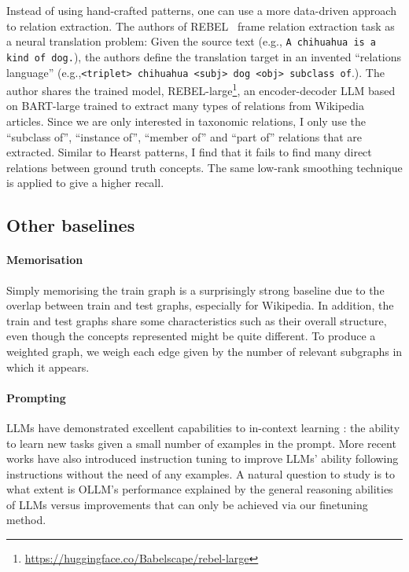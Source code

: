 Instead of using hand-crafted patterns, one can use a more data-driven approach to relation extraction. The authors of REBEL~\cite{cabot2021rebel} frame relation extraction task as a neural translation problem: Given the source text (e.g., \texttt{A chihuahua is a kind of dog.}), the authors define the translation target in an invented ``relations language'' (e.g.,\texttt{<triplet> chihuahua <subj> dog <obj> subclass of}.). The author shares the trained model, REBEL-large\footnote{\url{https://huggingface.co/Babelscape/rebel-large}}, an encoder-decoder LLM based on BART-large \cite{lewis2019bart} trained to extract many types of relations from Wikipedia articles. Since we are only interested in taxonomic relations, I only use the ``subclass of'', ``instance of'', ``member of'' and ``part of'' relations that are extracted. Similar to Hearst patterns, I find that it fails to find many direct relations between ground truth concepts. The same low-rank smoothing technique is applied to give a higher recall.


\subsection{Other baselines}

\paragraph{Memorisation}
Simply memorising the train graph is a surprisingly strong baseline due to the overlap between train and test graphs, especially for Wikipedia. In addition, the train and test graphs share some characteristics such as their overall structure, even though the concepts represented might be quite different. To produce a weighted graph, we weigh each edge given by the number of relevant subgraphs in which it appears.

\paragraph{Prompting}

LLMs have demonstrated excellent capabilities to in-context learning \cite{brown2020language}: the ability to learn new tasks given a small number of examples in the prompt. More recent works have also introduced instruction tuning \cite{ouyang2022training,rafailov2024direct} to improve LLMs' ability following instructions without the need of any examples. A natural question to study is to what extent is OLLM's performance explained by the general reasoning abilities of LLMs versus improvements that can only be achieved via our finetuning method.

